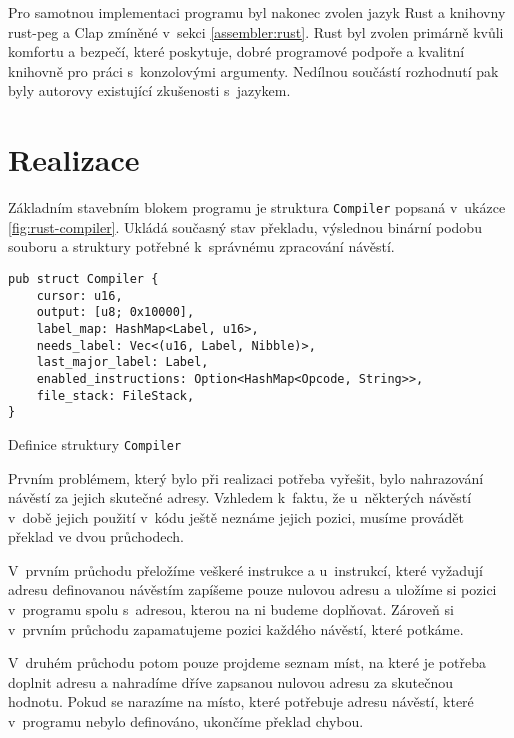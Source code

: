 Pro samotnou implementaci programu byl nakonec zvolen jazyk Rust a knihovny rust-peg a Clap zmíněné v~sekci \ref{assembler:rust}. Rust byl zvolen primárně kvůli komfortu a bezpečí, které poskytuje, dobré programové podpoře a kvalitní knihovně pro práci s~konzolovými argumenty. Nedílnou součástí rozhodnutí pak byly autorovy existující zkušenosti s~jazykem.

\section{Realizace}

Základním stavebním blokem programu je struktura \texttt{Compiler} popsaná v~ukázce \ref{fig:rust-compiler}. Ukládá současný stav překladu, výslednou binární podobu souboru a struktury potřebné k~správnému zpracování návěstí.

\begin{listing}
\begin{verbatim}
pub struct Compiler {
    cursor: u16,
    output: [u8; 0x10000],
    label_map: HashMap<Label, u16>,
    needs_label: Vec<(u16, Label, Nibble)>,
    last_major_label: Label,
    enabled_instructions: Option<HashMap<Opcode, String>>,
    file_stack: FileStack,
}
\end{verbatim}
\caption{Definice struktury \texttt{Compiler}}
\label{fig:rust-result}
\end{listing}

Prvním problémem, který bylo při realizaci potřeba vyřešit, bylo nahrazování návěstí za jejich skutečné adresy. Vzhledem k~faktu, že u~některých návěstí v~době jejich použití v~kódu ještě neznáme jejich pozici, musíme provádět překlad ve dvou průchodech.

V~prvním průchodu přeložíme veškeré instrukce a u~instrukcí, které vyžadují adresu definovanou návěstím zapíšeme pouze nulovou adresu a uložíme si pozici v~programu spolu s~adresou, kterou na ni budeme doplňovat. Zároveň si v~prvním průchodu zapamatujeme pozici každého návěstí, které potkáme.

V~druhém průchodu potom pouze projdeme seznam míst, na které je potřeba doplnit adresu a nahradíme dříve zapsanou nulovou adresu za skutečnou hodnotu. Pokud se narazíme na místo, které potřebuje adresu návěstí, které v~programu nebylo definováno, ukončíme překlad chybou.

